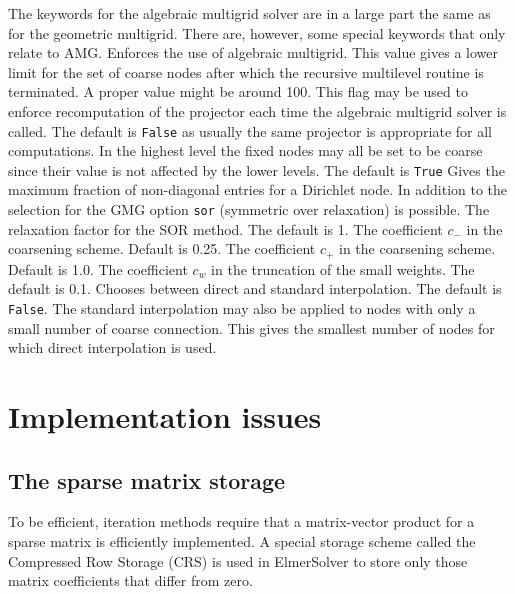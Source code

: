 The keywords for the algebraic multigrid solver are in a large part the same as
for the geometric multigrid. There are, however, some special keywords that
only relate to AMG.
\sifbegin
{}
Enforces the use of algebraic multigrid.
This value gives a lower limit for the set of coarse nodes after which
the recursive multilevel routine is terminated. A proper value 
might be around 100.
This flag may be used to enforce recomputation of the projector 
each time the algebraic multigrid solver is called. The default is
\texttt{False} as usually the same projector is appropriate for all
computations.
In the highest level the fixed nodes may all be set
to be coarse since their value is not affected by the lower levels.
The default is \texttt{True}
Gives the maximum fraction of non-diagonal entries for a Dirichlet node.
In addition to the selection for the GMG option \texttt{sor} (symmetric over relaxation)
is possible. 
The relaxation factor for the SOR method. The default is 1.
The coefficient $c_{-}$ in the coarsening scheme. Default is 0.25.
The coefficient $c_{+}$ in the coarsening scheme. Default is 1.0.
The coefficient $c_w$ in the truncation of the small weights. The default is 0.1.
Chooses between direct and standard interpolation. The default is \texttt{False}.
The standard interpolation may also be applied to nodes with 
only a small number of coarse connection. This gives the smallest number
of nodes for which direct interpolation is used.
\sifend




\section{Implementation issues}

\subsection{The sparse matrix storage}

To be efficient, iteration methods require that a matrix-vector product
for a sparse matrix is efficiently implemented. A special
storage scheme called the Compressed Row Storage (CRS) \cite{Barrett93} is used in ElmerSolver
to store only those matrix coefficients that differ from zero.

